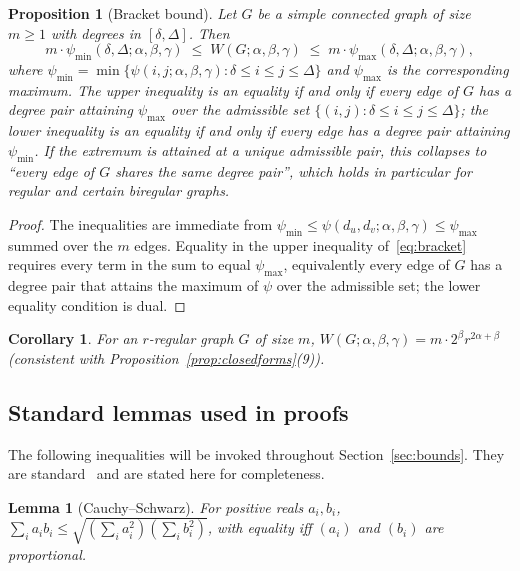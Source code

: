 \documentclass[11pt,a4paper]{article}
\newtheorem{proposition}[theorem]{Proposition}
\newtheorem{lemma}[theorem]{Lemma}
\newtheorem{corollary}[theorem]{Corollary}
\theoremstyle{definition}
\newcommand{\Wuzi}{W(G;\alpha,\beta,\gamma)}
\begin{document}
\begin{proposition}[Bracket bound]\label{thm:bracket}
Let $G$ be a simple connected graph of size $m\ge 1$ with degrees
in $[\delta,\Delta]$. Then
\begin{equation}\label{eq:bracket}
m\cdot \psi_{\min}(\delta,\Delta;\alpha,\beta,\gamma)
\;\le\; \Wuzi \;\le\;
m\cdot \psi_{\max}(\delta,\Delta;\alpha,\beta,\gamma),
\end{equation}
where
$\psi_{\min}=\min\{\psi(i,j;\alpha,\beta,\gamma):\delta\le i\le j\le\Delta\}$
and $\psi_{\max}$ is the corresponding maximum.
The upper inequality is an equality if and only if every edge of
$G$ has a degree pair attaining $\psi_{\max}$ over the admissible
set $\{(i, j) : \delta \le i \le j \le \Delta\}$; the lower
inequality is an equality if and only if every edge has a degree
pair attaining $\psi_{\min}$. If the extremum is attained at a
unique admissible pair, this collapses to ``every edge of $G$
shares the same degree pair'', which holds in particular for
regular and certain biregular graphs.
\end{proposition}

\begin{proof}
The inequalities are immediate from
$\psi_{\min}\le \psi(d_u,d_v;\alpha,\beta,\gamma)\le \psi_{\max}$
summed over the $m$ edges. Equality in the upper inequality
of~\eqref{eq:bracket} requires every term in the sum to equal
$\psi_{\max}$, equivalently every edge of $G$ has a degree pair
that attains the maximum of $\psi$ over the admissible set;
the lower equality condition is dual.
\end{proof}

\begin{corollary}\label{cor:regular_value}
For an $r$-regular graph $G$ of size $m$,
$\Wuzi = m\cdot 2^{\beta} r^{2\alpha+\beta}$
(consistent with Proposition~\ref{prop:closedforms}(9)).
\end{corollary}

\subsection{Standard lemmas used in proofs}\label{sec:lemmas}

The following inequalities will be invoked throughout
Section~\ref{sec:bounds}. They are
standard~\cite{HardyLittlewoodPolya1934} and are stated here for
completeness.

\begin{lemma}[Cauchy--Schwarz]\label{lem:cs}
For positive reals $a_i,b_i$,
\(\sum_i a_i b_i \le \sqrt{(\sum_i a_i^2)(\sum_i b_i^2)}\),
with equality iff $(a_i)$ and $(b_i)$ are proportional.
\end{lemma}
\end{document}
